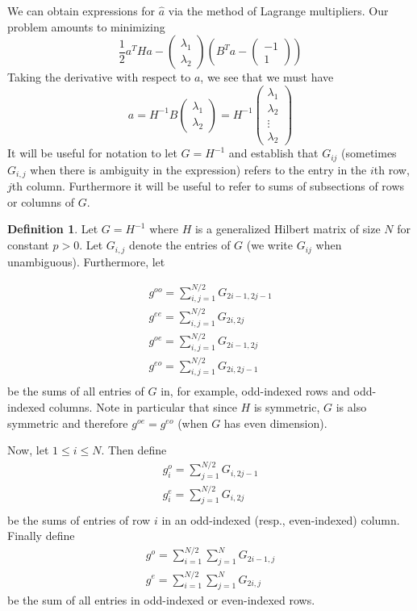 \documentclass[11pt]{article}
\theoremstyle{definition}
\newtheorem{defn}[thm]{Definition}
\theoremstyle{remark}
\numberwithin{equation}{section}
\begin{document}
We can obtain expressions for $\hat{a}$ via the method of Lagrange multipliers. Our problem amounts to minimizing 
\[ \frac{1}{2} a^T H a - \begin{pmatrix} \lambda_1 \\ \lambda_2 \end{pmatrix} (B^Ta - \begin{pmatrix} -1 \\ 1 \end{pmatrix} )\] 
Taking the derivative with respect to $a$, we see that we must have 
\[ a = H^{-1} B \begin{pmatrix} \lambda_1 \\ \lambda_2 \end{pmatrix} = H^{-1} \begin{pmatrix} \lambda_1 \\ \lambda_2 \\ \vdots \\ \lambda_2 \end{pmatrix}\]
It will be useful for notation to let $G = H^{-1}$ and establish that $G_{ij}$ (sometimes $G_{i,j}$ when there is ambiguity in the expression) refers to the entry in the $i$th row, $j$th column. Furthermore it will be useful to refer to sums of subsections of rows or columns of $G$. \\

\begin{defn}
Let $G=H^{-1}$ where $H$ is a generalized Hilbert matrix of size $N$ for constant $p > 0$. Let $G_{i,j}$ denote the entries of $G$ (we write $G_{ij}$ when unambiguous). Furthermore, let 

\begin{align*} 
g^{oo} = \sum_{i,j=1}^ {N/2}  G_{2i-1, 2j-1} \\
g^{ee} = \sum_{i,j=1}^ {N/2}  G_{2i, 2j} \\
g^{oe} = \sum_{i,j=1}^ {N/2}  G_{2i-1, 2j} \\
g^{eo} = \sum_{i,j=1}^ {N/2}  G_{2i, 2j-1} \\
\end{align*} be the sums of all entries of $G$ in, for example, odd-indexed rows and odd-indexed columns. Note in particular that since $H$ is symmetric, $G$ is also symmetric and therefore $g^{oe} = g^{eo}$ (when $G$ has even dimension). 

Now, let $1 \le i \le N$. Then define 
\begin{align*}
g_i^o= \sum_{j=1}^{N/2} G_{i, 2j-1} \\
g_i^e= \sum_{j=1}^{N/2} G_{i, 2j} \\
\end{align*} be the sums of entries of row $i$ in an odd-indexed (resp., even-indexed) column. 
Finally define 
\begin{align*}
g^o = \sum_{i=1}^{N/2} \sum_{j=1}^N G_{2i-1, j}\\
g^e = \sum_{i=1}^{N/2} \sum_{j=1}^N G_{2i, j}
\end{align*} be the sum of all entries in odd-indexed or even-indexed rows.
\end{defn} 
\end{document}

